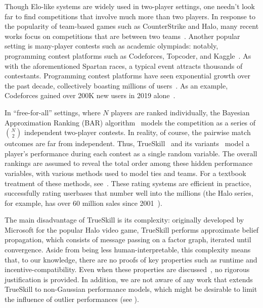 Though Elo-like systems are widely used in two-player settings, one needn't look far to find competitions that involve much more than two players. In response to the popularity of team-based games such as CounterStrike and Halo, many recent works focus on competitions that are between two teams~\cite{HLW06, CJ16, LCFHH18, GFYLWTFC20}. Another popular setting is many-player contests such as academic olympiads: notably, programming contest platforms such as Codeforces, Topcoder, and Kaggle~\cite{Codeforces, Topcoder, Kaggle}. As with the aforementioned Spartan races, a typical event attracts thousands of contestants. Programming contest platforms have seen exponential growth over the past decade, collectively boasting millions of users~\cite{KaggleMilestone}. As an example, Codeforces gained over 200K new users in 2019 alone~\cite{CFResults}.

In ``free-for-all'' settings, where $N$ players are ranked individually, the Bayesian Approximation Ranking (BAR) algorithm~\cite{WL11} models the competition as a series of $\binom N2$ independent two-player contests. In reality, of course, the pairwise match outcomes are far from independent. Thus, TrueSkill~\cite{HMG06} and its variants~\cite{NS10, DHMG07, MCZ18} model a player's performance during each contest as a single random variable. The overall rankings are assumed to reveal the total order among these hidden performance variables, with various methods used to model ties and teams. For a textbook treatment of these methods, see~\cite{Winn19}. These rating systems are efficient in practice, successfully rating userbases that number well into the millions (the Halo series, for example, has over 60 million sales since 2001~\cite{Halo}).

The main disadvantage of TrueSkill is its complexity: originally developed by Microsoft for the popular Halo video game, TrueSkill performs approximate belief propagation, which consists of message passing on a factor graph, iterated until convergence. Aside from being less human-interpretable, this complexity means that, to our knowledge, there are no proofs of key properties such as runtime and incentive-compatibility. Even when these properties are discussed~\cite{MCZ18}, no rigorous justification is provided. In addition, we are not aware of any work that extends TrueSkill to non-Gaussian performance models, which might be desirable to limit the influence of outlier performances (see ).

